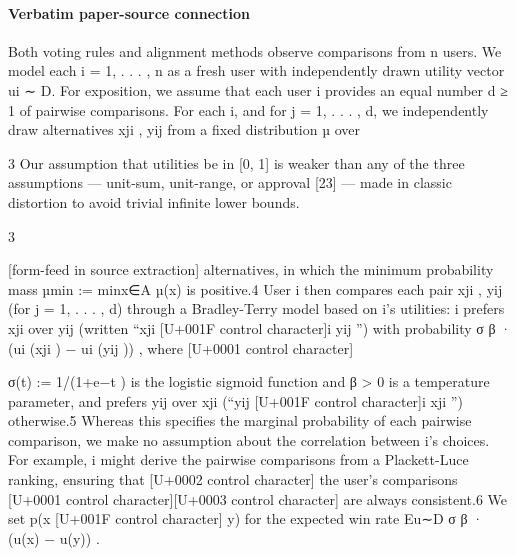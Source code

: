 \documentclass[10pt]{article}
\begin{document}
\paragraph{Verbatim paper-source connection}
\begin{ReviewVerbatim}
Both voting rules and alignment methods observe comparisons from n users. We model each
i = 1, . . . , n as a fresh user with independently drawn utility vector ui ∼ D. For exposition, we
assume that each user i provides an equal number d ≥ 1 of pairwise comparisons. For each i,
and for j = 1, . . . , d, we independently draw alternatives xji , yij from a fixed distribution µ over

    3
     Our assumption that utilities be in [0, 1] is weaker than any of the three assumptions — unit-sum, unit-range,
or approval [23] — made in classic distortion to avoid trivial infinite lower bounds.


                                                           3

[form-feed in source extraction]
alternatives, in which the minimum probability mass µmin := minx∈A µ(x) is positive.4 User i
then compares each pair {xji , yij } (for j = 1, . . . , d) through a Bradley-Terry model based on i’s
utilities: i prefers xji over yij (written “xji [U+001F control character]i yij ”) with probability σ β · (ui (xji ) − ui (yij )) , where
                                                                                                        [U+0001 control character]

σ(t) := 1/(1+e−t ) is the logistic sigmoid function and β > 0 is a temperature parameter, and prefers
yij over xji (“yij [U+001F control character]i xji ”) otherwise.5 Whereas this specifies the marginal probability of each pairwise
comparison, we make no assumption about the correlation between i’s choices. For example, i might
derive the pairwise comparisons from a Plackett-Luce ranking, ensuring that      [U+0002 control character] the user’s comparisons  [U+0001 control character][U+0003 control character]
are always consistent.6 We set p(x [U+001F control character] y) for the expected win rate Eu∼D σ β · (u(x) − u(y)) .
\end{ReviewVerbatim}
\end{document}

